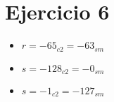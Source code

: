 \section*{Ejercicio 6}

\begin{itemize}
    \item $ r = -65_{c2} = -63_{sm} $
    \item $ s = -128_{c2} = -0_{sm} $
    \item $ s = -1_{c2} = -127_{sm} $
\end{itemize}